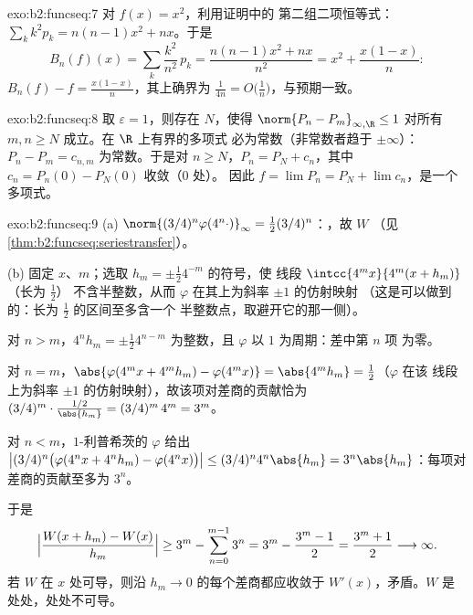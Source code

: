 \begin{solution}{exo:b2:funcseq:7}
对 $f(x) = x^2$，利用证明中的
第二组二项恒等式：$\sum_k k^2 p_k = n(n-1)x^2 + nx$。于是
\[
B_n(f)(x) = \sum_k \frac{k^2}{n^2}\,p_k
= \frac{n(n-1)x^2 + nx}{n^2}
= x^2 + \frac{x(1 - x)}{n} :
\]
$B_n(f) - f = \frac{x(1-x)}{n}$，其上确界为 $\frac{1}{4n} =
O\bigl(\frac1n\bigr)$，与预期一致。
\end{solution}

\begin{solution}{exo:b2:funcseq:8}
取 $\varepsilon = 1$，则存在 $N$，使得 $\norm{P_n - P_m}_{\infty,
\R} \leq 1$ 对所有 $m, n \geq N$ 成立。在 $\R$ 上有界的多项式
必为常数（非常数者趋于 $\pm\infty$）：$P_n - P_m =
c_{n,m}$ 为常数。于是对 $n \geq N$，$P_n = P_N + c_n$，其中
$c_n = P_n(0) - P_N(0)$ 收敛（$0$ 处）。
因此 $f = \lim P_n = P_N + \lim c_n$，是一个多项式。
\end{solution}

\begin{solution}{exo:b2:funcseq:9}
(a) $\norm{(3/4)^n\varphi(4^n\cdot)}_\infty = \frac12
(3/4)^n$：，故 $W$ 
（见\cref{thm:b2:funcseq:seriestransfer}）。

(b) 固定 $x$、$m$；选取 $h_m = \pm\frac12 4^{-m}$ 的符号，使
线段 $\intcc{4^mx}{4^m(x + h_m)}$（长为 $\frac12$）
不含半整数，从而 $\varphi$ 在其上为斜率 $\pm1$ 的仿射映射
（这是可以做到的：长为 $\frac12$ 的区间至多含一个
半整数点，取避开它的那一侧）。

对 $n > m$，$4^n h_m = \pm\frac12 4^{n-m}$ 为整数，且
$\varphi$ 以 $1$ 为周期：差中第 $n$ 项
为零。

对 $n = m$，$\abs{\varphi(4^m x + 4^m h_m) - \varphi(4^m x)} =
\abs{4^m h_m} = \frac12$（$\varphi$ 在该
线段上为斜率 $\pm 1$ 的仿射映射），故该项对差商的贡献恰为 $(3/4)^m \cdot
\frac{1/2}{\abs{h_m}} = (3/4)^m\,4^m = 3^m$。

对 $n < m$，$1$-利普希茨的 $\varphi$ 给出
$\bigl|(3/4)^n\bigl(\varphi(4^nx + 4^nh_m) -
\varphi(4^nx)\bigr)\bigr| \leq (3/4)^n 4^n\abs{h_m} =
3^n\abs{h_m}$：每项对差商的贡献至多为 $3^n$。

于是
\[
\Bigl|\frac{W(x + h_m) - W(x)}{h_m}\Bigr|
\geq 3^m - \sum_{n=0}^{m-1} 3^n
= 3^m - \frac{3^m - 1}{2} = \frac{3^m + 1}{2}
\longrightarrow \infty .
\]
若 $W$ 在 $x$ 处可导，则沿
$h_m \to 0$ 的每个差商都应收敛于 $W'(x)$，矛盾。$W$ 是
处处，处处不可导。
\end{solution}

